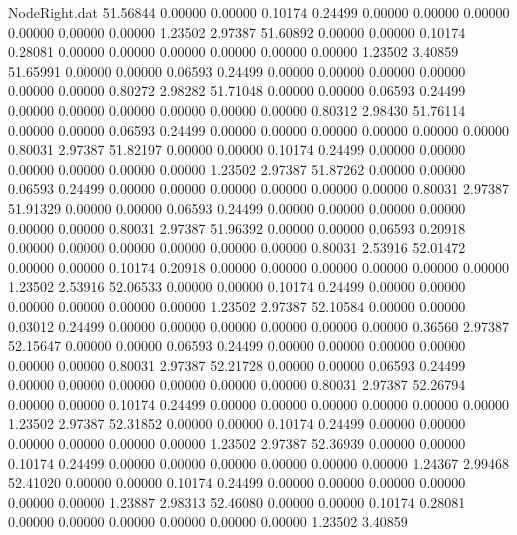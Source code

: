 \begin{filecontents}{NodeRight.dat}
  51.56844    0.00000    0.00000     0.10174    0.24499    0.00000    0.00000    0.00000    0.00000    0.00000    0.00000    1.23502    2.97387
  51.60892    0.00000    0.00000     0.10174    0.28081    0.00000    0.00000    0.00000    0.00000    0.00000    0.00000    1.23502    3.40859
  51.65991    0.00000    0.00000     0.06593    0.24499    0.00000    0.00000    0.00000    0.00000    0.00000    0.00000    0.80272    2.98282
  51.71048    0.00000    0.00000     0.06593    0.24499    0.00000    0.00000    0.00000    0.00000    0.00000    0.00000    0.80312    2.98430
  51.76114    0.00000    0.00000     0.06593    0.24499    0.00000    0.00000    0.00000    0.00000    0.00000    0.00000    0.80031    2.97387
  51.82197    0.00000    0.00000     0.10174    0.24499    0.00000    0.00000    0.00000    0.00000    0.00000    0.00000    1.23502    2.97387
  51.87262    0.00000    0.00000     0.06593    0.24499    0.00000    0.00000    0.00000    0.00000    0.00000    0.00000    0.80031    2.97387
  51.91329    0.00000    0.00000     0.06593    0.24499    0.00000    0.00000    0.00000    0.00000    0.00000    0.00000    0.80031    2.97387
  51.96392    0.00000    0.00000     0.06593    0.20918    0.00000    0.00000    0.00000    0.00000    0.00000    0.00000    0.80031    2.53916
  52.01472    0.00000    0.00000     0.10174    0.20918    0.00000    0.00000    0.00000    0.00000    0.00000    0.00000    1.23502    2.53916
  52.06533    0.00000    0.00000     0.10174    0.24499    0.00000    0.00000    0.00000    0.00000    0.00000    0.00000    1.23502    2.97387
  52.10584    0.00000    0.00000     0.03012    0.24499    0.00000    0.00000    0.00000    0.00000    0.00000    0.00000    0.36560    2.97387
  52.15647    0.00000    0.00000     0.06593    0.24499    0.00000    0.00000    0.00000    0.00000    0.00000    0.00000    0.80031    2.97387
  52.21728    0.00000    0.00000     0.06593    0.24499    0.00000    0.00000    0.00000    0.00000    0.00000    0.00000    0.80031    2.97387
  52.26794    0.00000    0.00000     0.10174    0.24499    0.00000    0.00000    0.00000    0.00000    0.00000    0.00000    1.23502    2.97387
  52.31852    0.00000    0.00000     0.10174    0.24499    0.00000    0.00000    0.00000    0.00000    0.00000    0.00000    1.23502    2.97387
  52.36939    0.00000    0.00000     0.10174    0.24499    0.00000    0.00000    0.00000    0.00000    0.00000    0.00000    1.24367    2.99468
  52.41020    0.00000    0.00000     0.10174    0.24499    0.00000    0.00000    0.00000    0.00000    0.00000    0.00000    1.23887    2.98313
  52.46080    0.00000    0.00000     0.10174    0.28081    0.00000    0.00000    0.00000    0.00000    0.00000    0.00000    1.23502    3.40859

\end{filecontents}
